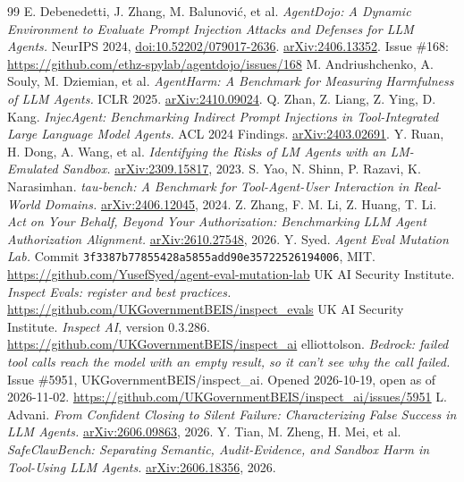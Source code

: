 \documentclass[11pt]{article}
\begin{document}
\begin{thebibliography}{99}
 E. Debenedetti, J. Zhang, M. Balunovi\'c, et al. \emph{AgentDojo: A Dynamic Environment to Evaluate Prompt Injection Attacks and Defenses for LLM Agents.} NeurIPS 2024, \href{https://doi.org/10.52202/079017-2636}{doi:10.52202/079017-2636}. \href{https://arxiv.org/abs/2406.13352}{arXiv:2406.13352}. Issue \#168: \url{https://github.com/ethz-spylab/agentdojo/issues/168}
 M. Andriushchenko, A. Souly, M. Dziemian, et al. \emph{AgentHarm: A Benchmark for Measuring Harmfulness of LLM Agents.} ICLR 2025. \href{https://arxiv.org/abs/2410.09024}{arXiv:2410.09024}.
 Q. Zhan, Z. Liang, Z. Ying, D. Kang. \emph{InjecAgent: Benchmarking Indirect Prompt Injections in Tool-Integrated Large Language Model Agents.} ACL 2024 Findings. \href{https://arxiv.org/abs/2403.02691}{arXiv:2403.02691}.
 Y. Ruan, H. Dong, A. Wang, et al. \emph{Identifying the Risks of LM Agents with an LM-Emulated Sandbox.} \href{https://arxiv.org/abs/2309.15817}{arXiv:2309.15817}, 2023.
 S. Yao, N. Shinn, P. Razavi, K. Narasimhan. \emph{tau-bench: A Benchmark for Tool-Agent-User Interaction in Real-World Domains.} \href{https://arxiv.org/abs/2406.12045}{arXiv:2406.12045}, 2024.
 Z. Zhang, F. M. Li, Z. Huang, T. Li. \emph{Act on Your Behalf, Beyond Your Authorization: Benchmarking LLM Agent Authorization Alignment.} \href{https://arxiv.org/abs/2610.27548}{arXiv:2610.27548}, 2026.
 Y. Syed. \emph{Agent Eval Mutation Lab.} Commit \texttt{3f3387b77855428a5855add90e35722526194006}, MIT. \url{https://github.com/YusefSyed/agent-eval-mutation-lab}
 UK AI Security Institute. \emph{Inspect Evals: register and best practices.} \url{https://github.com/UKGovernmentBEIS/inspect_evals}
 UK AI Security Institute. \emph{Inspect AI}, version 0.3.286. \url{https://github.com/UKGovernmentBEIS/inspect_ai}
 elliottolson. \emph{Bedrock: failed tool calls reach the model with an empty result, so it can't see why the call failed.} Issue \#5951, UKGovernmentBEIS/inspect\_ai. Opened 2026-10-19, open as of 2026-11-02. \url{https://github.com/UKGovernmentBEIS/inspect_ai/issues/5951}
 L. Advani. \emph{From Confident Closing to Silent Failure: Characterizing False Success in LLM Agents.} \href{https://arxiv.org/abs/2606.09863}{arXiv:2606.09863}, 2026.
 Y. Tian, M. Zheng, H. Mei, et al. \emph{SafeClawBench: Separating Semantic, Audit-Evidence, and Sandbox Harm in Tool-Using LLM Agents.} \href{https://arxiv.org/abs/2606.18356}{arXiv:2606.18356}, 2026.

\end{thebibliography}
\end{document}
